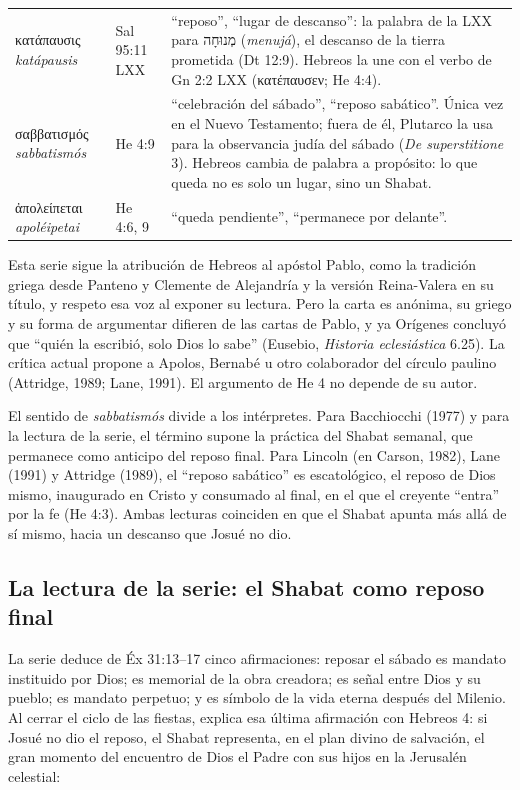 \documentclass[11pt,letterpaper]{article}
\newcommand{\heb}[1]{\mbox{\foreignlanguage{hebrew}{#1}}}
\newcommand{\grc}[1]{\foreignlanguage{ancientgreek}{#1}}
\begin{document}
\begin{filologia}[He 4:9]
\begin{tabular}{@{}L{3.4cm}L{2.1cm}L{9.3cm}@{}}
\grc{κατάπαυσις} \emph{katápausis} & Sal 95:11 LXX & ``reposo'', ``lugar de descanso'': la palabra de la LXX para \heb{מְנוּחָה} (\emph{menujá}), el descanso de la tierra prometida (Dt 12:9). Hebreos la une con el verbo de Gn 2:2 LXX (\grc{κατέπαυσεν}; He 4:4). \\[2pt]
\grc{σαββατισμός} \emph{sabbatismós} & He 4:9 & ``celebración del sábado'', ``reposo sabático''. Única vez en el Nuevo Testamento; fuera de él, Plutarco la usa para la observancia judía del sábado (\emph{De superstitione} 3). Hebreos cambia de palabra a propósito: lo que queda no es solo un lugar, sino un Shabat. \\[2pt]
\grc{ἀπολείπεται} \emph{apoléipetai} & He 4:6, 9 & ``queda pendiente'', ``permanece por delante''. \\
\end{tabular}
\end{filologia}

\begin{nota}
Esta serie sigue la atribución de Hebreos al apóstol Pablo, como la tradición griega desde Panteno y Clemente de Alejandría y la versión Reina-Valera en su título, y respeto esa voz al exponer su lectura. Pero la carta es anónima, su griego y su forma de argumentar difieren de las cartas de Pablo, y ya Orígenes concluyó que ``quién la escribió, solo Dios lo sabe'' (Eusebio, \emph{Historia eclesiástica} 6.25). La crítica actual propone a Apolos, Bernabé u otro colaborador del círculo paulino (Attridge, 1989; Lane, 1991). El argumento de He 4 no depende de su autor.
\end{nota}

El sentido de \emph{sabbatismós} divide a los intérpretes. Para Bacchiocchi (1977) y para la lectura de la serie, el término supone la práctica del Shabat semanal, que permanece como anticipo del reposo final. Para Lincoln (en Carson, 1982), Lane (1991) y Attridge (1989), el ``reposo sabático'' es escatológico, el reposo de Dios mismo, inaugurado en Cristo y consumado al final, en el que el creyente ``entra'' por la fe (He 4:3). Ambas lecturas coinciden en que el Shabat apunta más allá de sí mismo, hacia un descanso que Josué no dio.

\subsection{La lectura de la serie: el Shabat como reposo final}
La serie deduce de Éx 31:13--17 cinco afirmaciones: reposar el sábado es mandato instituido por Dios; es memorial de la obra creadora; es señal entre Dios y su pueblo; es mandato perpetuo; y es símbolo de la vida eterna después del Milenio. Al cerrar el ciclo de las fiestas, explica esa última afirmación con Hebreos 4: si Josué no dio el reposo, el Shabat representa, en el plan divino de salvación, el gran momento del encuentro de Dios el Padre con sus hijos en la Jerusalén celestial:
\end{document}
